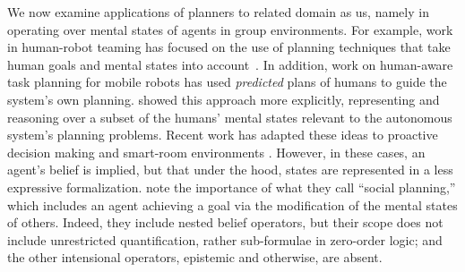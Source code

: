 We now examine applications of planners to related domain as us,
namely in operating over mental states of agents in group environments.
For example, work in human-robot teaming has focused on
the use of planning techniques that take human goals and
mental states into account~\cite{briggs_multi-modal_2012}.
In addition, work on human-aware task planning for mobile robots
\cite{cirillo_human-aware_2009} has used \emph{predicted} plans of humans to
guide the system's own planning.
\cite{talamadupula_coordination_2014,chakraborti_planning_2015} showed this
approach more explicitly, representing and reasoning over a subset
of the humans' mental states relevant to the autonomous system's planning
problems.
Recent work has adapted these ideas to proactive decision making
\cite{sengupta_radar_2017,kim_towards_2017} and smart-room environments
\cite{chakraborti_mr._2017}. However, in these cases, an agent's belief
is implied, but that under the hood, states are represented in a less
expressive formalization. \cite{pearce_etal_social_planning_aaai2014}
note the importance of what they call ``social planning,'' which
includes an agent achieving a goal via the modification of the mental
states of others. Indeed, they include nested belief operators, but
their scope does not include unrestricted quantification, rather
sub-formulae in zero-order logic; and the other intensional operators,
epistemic and otherwise, are absent.
